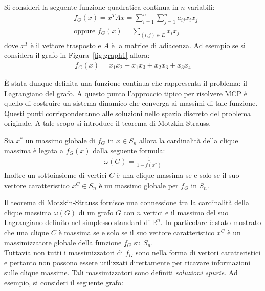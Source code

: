 Si consideri la seguente funzione quadratica continua in $n$ variabili:
\begin{align*}
	&f_G(x) = x^T A x = \sum_{i=1}^n \sum_{j=1}^n a_{ij} x_i x_j \tag{Lagrangiano del grafo} \\
	&\text{oppure } f_G(\bar{x}) = \sum_{(i,j) \in E} x_i x_j
\end{align*}
dove $x^T$ è il vettore trasposto e $A$ è la matrice di adiacenza. Ad esempio se si considera il grafo in Figura~\ref{fig:graph1} allora:
\begin{align*}
	f_G(x) = x_1 x_2 + x_1 x_3 + x_2 x_3 + x_3 x_4
\end{align*}

È stata dunque definita una funzione continua che rappresenta il problema: il Lagrangiano del grafo. A questo punto l'approccio tipico per risolvere MCP è quello di costruire un sistema dinamico che converga ai massimi di tale funzione. Questi punti corrisponderanno alle soluzioni nello spazio discreto del problema originale. A tale scopo si introduce il teorema di Motzkin-Strauss.
\begin{thm}
	Sia $x^*$ un massimo globale di $f_G$ in $x \in S_n$ allora la cardinalità della clique massima è legata a $f_G(x)$  dalla seguente formula:
	\begin{align*}
		\omega(G) = \frac{1}{1 - f(x^*)}
	\end{align*}
	Inoltre un sottoinsieme di vertici $C$ è una clique massima se e solo se il suo vettore caratteristico $x^C \in S_n$ è un massimo globale per $f_G$ in $S_n$.
	\end{thm} 
	\newpage

	Il teorema di Motzkin-Strauss fornisce una connessione tra la cardinalità della clique massima $\omega(G)$ di un grafo $G$ con $n$ vertici e il massimo del suo Lagrangiano definito nel simplesso standard di $\mathbb{R}^n$. In particolare è stato mostrato che una clique $C$ è massima se e solo se il suo vettore caratteristico $x^C$ è un massimizzatore globale della funzione $f_G$ su $S_n$.\\

	Tuttavia non tutti i massimizzatori di $f_G$ sono nella forma di vettori caratteristici e pertanto non possono essere utilizzati direttamente per ricavare informazioni sulle clique massime. Tali massimizzatori sono definiti \emph{soluzioni spurie}. Ad esempio, si consideri il seguente grafo:

